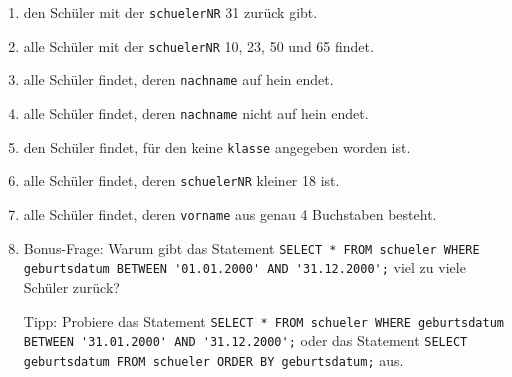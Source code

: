\begin{Exercise}[title={Erstelle ein SELECT-Statement mit WHERE-Klausel, das}, label=Where]
	\begin{enumerate}
		\item den Schüler mit der \lstinline!schuelerNR! 31 zurück gibt.
		\item alle Schüler mit der \lstinline!schuelerNR! 10, 23, 50 und 65 findet.
		\item alle Schüler findet, deren \lstinline!nachname! auf hein endet.
		\item alle Schüler findet, deren \lstinline!nachname! nicht auf hein endet.
		\item den Schüler findet, für den keine \lstinline!klasse! angegeben worden ist.
		\item alle Schüler findet, deren \lstinline!schuelerNR! kleiner 18 ist.
		\item alle Schüler findet, deren \lstinline!vorname! aus genau 4 Buchstaben besteht.
		\item Bonus-Frage: Warum gibt das Statement \lstinline!SELECT * FROM schueler WHERE geburtsdatum BETWEEN '01.01.2000' AND '31.12.2000';! viel zu viele Schüler zurück?

		Tipp: Probiere das Statement \lstinline!SELECT * FROM schueler WHERE geburtsdatum BETWEEN '31.01.2000' AND '31.12.2000';! oder das Statement \lstinline!SELECT geburtsdatum FROM schueler ORDER BY geburtsdatum;! aus.
	\end{enumerate}
\end{Exercise}
